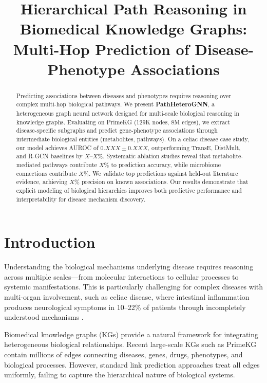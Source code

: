 \documentclass[twoside]{article}
\title{Hierarchical Path Reasoning in Biomedical Knowledge Graphs:\\
Multi-Hop Prediction of Disease-Phenotype Associations}
\author{\theauthors}
\date{}
\begin{document}
\maketitle

\begin{abstract}
Predicting associations between diseases and phenotypes requires reasoning over complex multi-hop biological pathways. We present \textbf{PathHeteroGNN}, a heterogeneous graph neural network designed for multi-scale biological reasoning in knowledge graphs. Evaluating on PrimeKG (129K nodes, 8M edges), we extract disease-specific subgraphs and predict gene-phenotype associations through intermediate biological entities (metabolites, pathways). On a celiac disease case study, our model achieves AUROC of $0.XXX \pm 0.XXX$, outperforming TransE, DistMult, and R-GCN baselines by $X$--$X$\%. Systematic ablation studies reveal that metabolite-mediated pathways contribute $X$\% to prediction accuracy, while microbiome connections contribute $X$\%. We validate top predictions against held-out literature evidence, achieving $X$\% precision on known associations. Our results demonstrate that explicit modeling of biological hierarchies improves both predictive performance and interpretability for disease mechanism discovery.
\end{abstract}

\section{Introduction}

Understanding the biological mechanisms underlying disease requires reasoning across multiple scales—from molecular interactions to cellular processes to systemic manifestations. This is particularly challenging for complex diseases with multi-organ involvement, such as celiac disease, where intestinal inflammation produces neurological symptoms in 10–22\% of patients through incompletely understood mechanisms \citep{lebwohl2018celiac}.

Biomedical knowledge graphs (KGs) provide a natural framework for integrating heterogeneous biological relationships. Recent large-scale KGs such as PrimeKG \citep{chandak2023primekg} contain millions of edges connecting diseases, genes, drugs, phenotypes, and biological processes. However, standard link prediction approaches treat all edges uniformly, failing to capture the hierarchical nature of biological systems.
\end{document}
